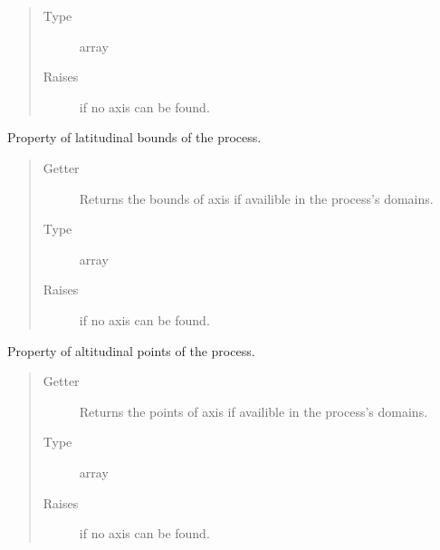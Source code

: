 \documentclass[a4paper,10pt,english]{sphinxmanual}
\begin{document}
\begin{fulllineitems}
\begin{fulllineitems}
\begin{quote}
\begin{description}
\item[{Type}] \leavevmode
array

\item[{Raises}] \leavevmode
{}
if no  axis can be found.

\end{description}\end{quote}

\end{fulllineitems}


\begin{fulllineitems}
\label{api/climlab.process:climlab.process.process.Process.lat_bounds}
Property of latitudinal bounds of the process.
\begin{quote}\begin{description}
\item[{Getter}] \leavevmode
Returns the bounds of axis  if availible in the
process's domains.

\item[{Type}] \leavevmode
array

\item[{Raises}] \leavevmode
{}
if no  axis can be found.

\end{description}\end{quote}

\end{fulllineitems}


\begin{fulllineitems}
\label{api/climlab.process:climlab.process.process.Process.lev}
Property of altitudinal points of the process.
\begin{quote}\begin{description}
\item[{Getter}] \leavevmode
Returns the points of axis  if availible in the
process's domains.

\item[{Type}] \leavevmode
array

\item[{Raises}] \leavevmode
{}
if no  axis can be found.

\end{description}\end{quote}


\end{fulllineitems}
\end{fulllineitems}
\end{document}
